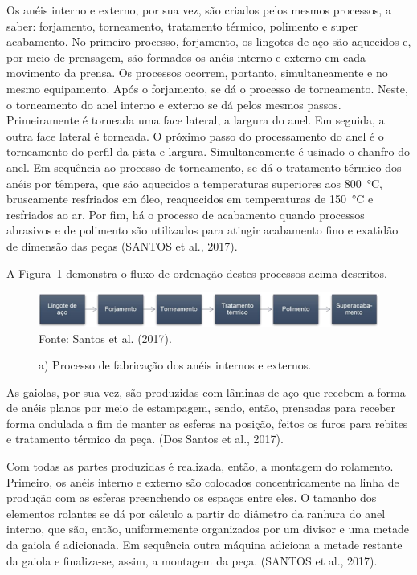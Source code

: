 \documentclass[
	12pt,				
	oneside,			
	a4paper,			
	english,			
	brazil,			
	]{abntex2ppgsi}
\begin{document}
Os anéis interno e externo, por sua vez, são criados pelos mesmos processos, a saber: forjamento, torneamento, tratamento térmico, polimento e super acabamento. No primeiro processo, forjamento, os lingotes de aço são aquecidos e, por meio de prensagem, são formados os anéis interno e externo em cada movimento da prensa. Os processos ocorrem, portanto, simultaneamente e no mesmo equipamento. Após o forjamento, se dá o processo de torneamento. Neste, o torneamento do anel interno e externo se dá pelos mesmos passos. Primeiramente é torneada uma face lateral, a largura do anel. Em seguida, a outra face lateral é torneada. O próximo passo do processamento do anel é o torneamento do perfil da pista e largura. Simultaneamente é usinado o chanfro do anel. Em sequência ao processo de torneamento, se dá o tratamento térmico dos anéis por têmpera, que são aquecidos a temperaturas superiores aos \SI{800}{\celsius}, bruscamente resfriados em óleo, reaquecidos em temperaturas de \SI{150}{\celsius} e resfriados ao ar. Por fim, há o processo de acabamento quando processos abrasivos e de polimento são utilizados para atingir acabamento fino e exatidão de dimensão das peças (SANTOS et al., 2017). 


A Figura~\ref{FiguraProcessoFabricacao} demonstra o fluxo de ordenação destes processos acima descritos.
\begin{figure}[!htb]
\centering
\caption{a) Processo de fabricação dos anéis internos e externos.}
\includegraphics[width=\textwidth,height=\textheight,keepaspectratio]{Figura2} \\
Fonte: Santos et al. (2017).
\label{FiguraProcessoFabricacao}
\end{figure}

As gaiolas, por sua vez, são produzidas com lâminas de aço que recebem a forma de anéis planos por meio de estampagem, sendo, então, prensadas para receber forma ondulada a fim de manter as esferas na posição, feitos os furos para rebites e tratamento térmico da peça. (Dos Santos et al., 2017).
 
Com todas as partes produzidas é realizada, então, a montagem do rolamento. Primeiro, os anéis interno e externo são colocados concentricamente na linha de produção com as esferas preenchendo os espaços entre eles. O tamanho dos elementos rolantes se dá por cálculo a partir do diâmetro da ranhura do anel interno, que são, então, uniformemente organizados por um divisor e uma metade da gaiola é adicionada. Em sequência outra máquina adiciona a metade restante da gaiola e finaliza-se, assim, a montagem da peça. (SANTOS et al., 2017). 
\end{document}
